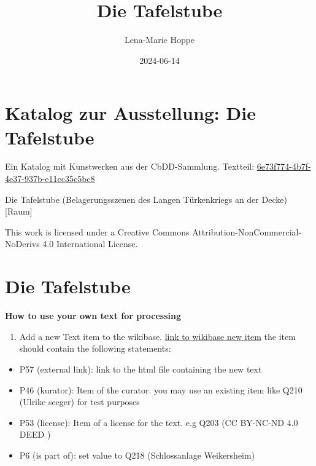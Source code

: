 \documentclass[
  letterpaper,
]{book}
\title{Die Tafelstube}
\author{Lena-Marie Hoppe}
\date{2024-06-14}
\providecommand{\tightlist}{%
  \setlength{\itemsep}{0pt}\setlength{\parskip}{0pt}}\usepackage{longtable,booktabs,array}
\renewcommand*\contentsname{Table of contents}
\newcommand\contentsname{Table of contents}
\begin{document}
\frontmatter
\maketitle

\renewcommand*\contentsname{Table of contents}
{
\setcounter{tocdepth}{2}
\tableofcontents
}
\mainmatter
{}

\chapter{Katalog zur Ausstellung: Die
Tafelstube}\label{katalog-zur-ausstellung-die-tafelstube}

Ein Katalog mit Kunstwerken aus der CbDD-Sammlung. Textteil:
\href{https://www.deckenmalerei.eu/42d06165-58e7-4653-bfe4-3d5f7091fc33\#6e73f774-4b7f-4e37-937b-e11cc35c5bc8}{6e73f774-4b7f-4e37-937b-e11cc35c5bc8}

Die Tafelstube (Belagerungsszenen des Langen Türkenkriegs an der Decke)
{[}Raum{]}

This work is licensed under a Creative Commons
Attribution-NonCommercial-NoDerivs 4.0 International License.


\chapter{Die Tafelstube}\label{die-tafelstube}

\textbf{How to use your own text for processing}

\begin{enumerate}
\def\labelenumi{\arabic{enumi}.}
\tightlist
\item
  Add a new Text item to the wikibase.
  \href{https://computational-publishing-service.wikibase.cloud/wiki/Special:NewItem}{link
  to wikibase new item} the item should contain the following
  statements:
\end{enumerate}

\begin{itemize}
\tightlist
\item
  P57 (external link): link to the html file containing the new text
\item
  P46 (kurator): Item of the curator. you may use an existing item like
  Q210 (Ulrike seeger) for test purposes
\item
  P53 (license): Item of a license for the text. e.g Q203 (CC BY-NC-ND
  4.0 DEED )
\item
  P6 (is part of): set value to Q218 (Schlossanlage Weikersheim)
\end{itemize}
\end{document}
